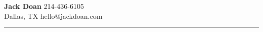 \textbf{\Large Jack Doan} \hfill 214-436-6105\\
Dallas, TX \hfill hello@jackdoan.com \\
\textcolor[RGB]{200,200,200}{\rule{\linewidth}{0.2pt}}
